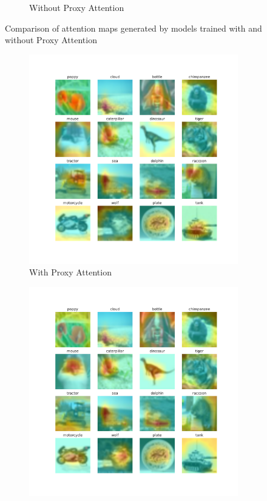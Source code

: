 \begin{figure}[H]
\begin{subfigure}[b]{.7\textwidth}
        \caption{Without Proxy Attention}
        \label{fig:noproxy}
    \end{subfigure}
    \caption{Comparison of attention maps generated by models trained with and without Proxy Attention}
    \label{fig:attention}
\end{figure}

\begin{figure}[H]
    \centering
    \begin{subfigure}[b]{0.7\textwidth}
        \includegraphics[width=\textwidth]{images/proxy_1.pdf}
        \caption{With Proxy Attention}
        \label{fig:proxy2}
    \end{subfigure}
    \hfill
    \begin{subfigure}[b]{.7\textwidth}
        \includegraphics[width=\textwidth]{images/noproxy_1.pdf}

\end{subfigure}
\end{figure}
